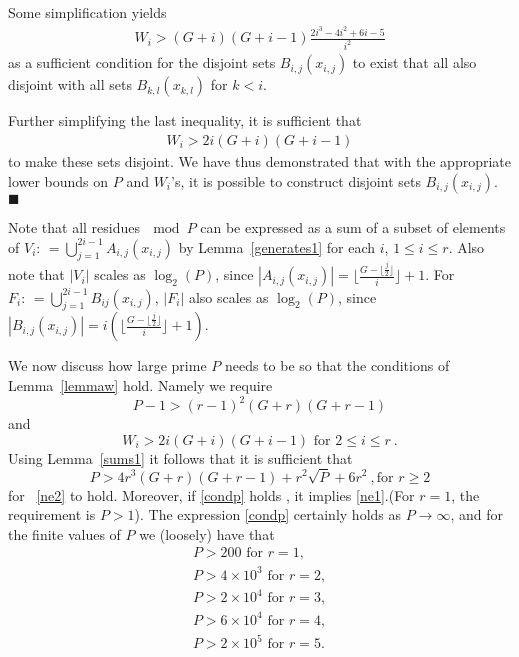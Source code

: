 \documentclass[12pt]{article} \pagestyle{plain} \topmargin
\newcommand{\asn}{\ensuremath{:\,=}}
\begin{document}
Some simplification yields
\begin{equation}\begin{array}{lll} W_i>
(G+i)(G+i-1)\frac{2i^3-4i^2+6i-5}{i^2}
\end{array}\end{equation}
as a sufficient condition for the disjoint sets $B_{i,j}(x_{i,j})$
to exist that all also disjoint with all sets $B_{k,l}(x_{k,l})$
for $k<i$.

Further simplifying the last inequality, it is sufficient that
\begin{equation}\begin{array}{lll} W_i>
2i(G+i)(G+i-1)
\end{array}\end{equation}
to make these sets disjoint. We have thus demonstrated that with
the appropriate lower bounds on $P$ and $W_i$'s, it is possible to
construct disjoint sets $B_{i,j}(x_{i,j})$.
 \hfill$\blacksquare$

Note that all residues$~\mod P$ can be expressed as a sum of a
subset of elements of $V_i \asn
\bigcup_{j=1}^{2i-1}A_{i,j}(x_{i,j})$ by Lemma~\ref{generates1} for
each $i$, $1\leq i \leq r$. Also note that $|V_i|$ scales as
$\log_2(P)$, since $|A_{i,j}(x_{i,j})|=\lfloor \frac{G-\lfloor
\frac{j}{2} \rfloor}{i}\rfloor+1$. For $F_i \asn
\bigcup_{j=1}^{2i-1}B_{ij}(x_{i,j})$,
 $|F_i|$ also scales as
$\log_2(P)$, since  $|B_{i,j}(x_{i,j})|=i\left(\lfloor
\frac{G-\lfloor \frac{j}{2} \rfloor}{i}\rfloor+1\right)$.




We now discuss how large prime $P$ needs to be so that the
conditions of Lemma~\ref{lemmaw} hold. Namely we require
\begin{equation}\label{ne1}
P-1> (r-1)^2(G+r)(G+r-1) \end{equation} and
\begin{equation}\label{ne2}W_i>2i(G+i)(G+i-1) \text{ for }2 \leq i \leq r~. \end{equation} Using
Lemma~\ref{sums1} it follows that it is sufficient that
\begin{equation}\label{condp}
P > 4r^3(G+r)(G+r-1)+r^2\sqrt{P}+6r^2~, \text{for } r \geq 2
\end{equation}
for  ~\eqref{ne2} to hold.  Moreover, if \eqref{condp} holds , it
implies \eqref{ne1}.(For $r=1$, the requirement is $P>1$). The
expression \eqref{condp} certainly holds as $P\rightarrow \infty$,
and for the finite values of $P$ we (loosely) have that
\begin{eqnarray*}
P>200 \text{ for } r=1, \\P>4\times 10^3 \text{ for } r=2,
\\P>2\times 10^4 \text{ for } r=3,\\ P>6\times 10^4 \text{ for }
r=4,\\P>2 \times 10^5 \text{ for } r=5.
\end{eqnarray*}
\end{document}
